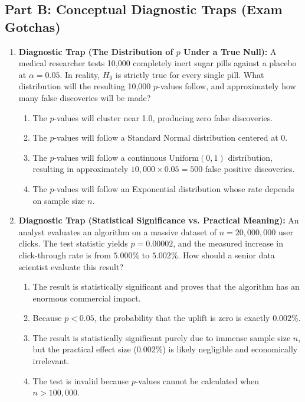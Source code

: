 \subsection*{Part B: Conceptual Diagnostic Traps (Exam Gotchas)}

\begin{enumerate}[resume]
\item \textbf{Diagnostic Trap (The Distribution of $p$ Under a True Null):}
A medical researcher tests 10,000 completely inert sugar pills against a placebo at $\alpha = 0.05$. In reality, $H_0$ is strictly true for every single pill. What distribution will the resulting 10,000 $p$-values follow, and approximately how many false discoveries will be made?
\begin{enumerate}
    \item The $p$-values will cluster near 1.0, producing zero false discoveries.
    \item The $p$-values will follow a Standard Normal distribution centered at 0.
    \item The $p$-values will follow a continuous $\text{Uniform}(0, 1)$ distribution, resulting in approximately $10,000 \times 0.05 = 500$ false positive discoveries.
    \item The $p$-values will follow an Exponential distribution whose rate depends on sample size $n$.
\end{enumerate}

\item \textbf{Diagnostic Trap (Statistical Significance vs. Practical Meaning):}
An analyst evaluates an algorithm on a massive dataset of $n = 20,000,000$ user clicks. The test statistic yields $p = 0.00002$, and the measured increase in click-through rate is from $5.000\%$ to $5.002\%$. How should a senior data scientist evaluate this result?
\begin{enumerate}
    \item The result is statistically significant and proves that the algorithm has an enormous commercial impact.
    \item Because $p < 0.05$, the probability that the uplift is zero is exactly $0.002\%$.
    \item The result is statistically significant purely due to immense sample size $n$, but the practical effect size ($0.002\%$) is likely negligible and economically irrelevant.
    \item The test is invalid because $p$-values cannot be calculated when $n > 100,000$.
\end{enumerate}
\end{enumerate}

